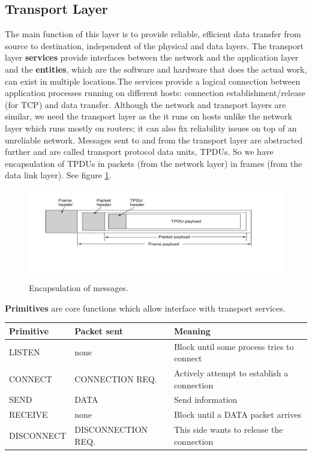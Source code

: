\documentclass[twoside]{article}
\begin{document}
\subsection{Transport Layer}
The main function of this layer is to provide reliable, efficient data transfer
from source to destination, independent of the physical and data layers. The
transport layer \textbf{services} provide interfaces between the network and 
the application layer and the \textbf{entities}, which are the software and 
hardware that does the actual work, can exist in multiple locations.The services 
provide a logical connection between application processes running on different
hosts: connection establishment/release (for TCP) and data transfer. 
Although the network and transport layers are similar, we need the transport 
layer as the it runs on hosts unlike the network layer which runs mostly on 
routers; it can also fix reliability issues on top of an unreliable network. 
Messages sent to and from the transport layer are abstracted further and are
called transport protocol data units, TPDUs. So we have encapsulation of TPDUs
in packets (from the network layer) in frames (from the data link layer). See
figure \ref{fig:encaps}.
\begin{figure}
  \includegraphics[width=\linewidth]{encaps.png}
  \caption{Encapsulation of messages.}
  \label{fig:encaps}
\end{figure}
\textbf{Primitives} are core functions which allow interface with transport 
services.
\begin{center}
    \begin{tabular}{| l | l | l |}
        \hline \textbf{Primitive} & \textbf{Packet sent} & \textbf{Meaning} \\ \hline
        \hline LISTEN & none & Block until some process tries to connect \\ \hline
        \hline CONNECT & CONNECTION REQ. & Actively attempt to establish a connection \\ \hline
        \hline SEND & DATA & Send information \\ \hline
        \hline RECEIVE & none & Block until a DATA packet arrives \\ \hline
        \hline DISCONNECT & DISCONNECTION REQ. & This side wants to release the connection \\ \hline
    \end{tabular}
\end{center}
\end{document}
